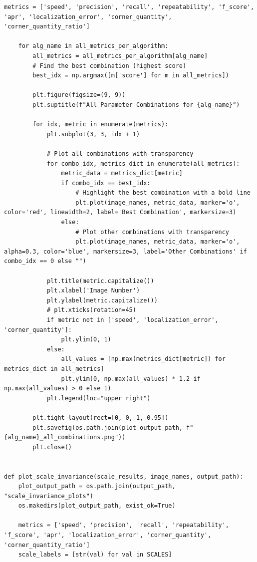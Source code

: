 \documentclass[journal]{IEEEtran}
\begin{document}
\begin{lstlisting}[style=python, caption={Utility Functions for Data Processing}, label={lst:utilities}]
    metrics = ['speed', 'precision', 'recall', 'repeatability', 'f_score', 'apr', 'localization_error', 'corner_quantity', 'corner_quantity_ratio']
    
    for alg_name in all_metrics_per_algorithm:
        all_metrics = all_metrics_per_algorithm[alg_name]
        # Find the best combination (highest score)
        best_idx = np.argmax([m['score'] for m in all_metrics])
        
        plt.figure(figsize=(9, 9))
        plt.suptitle(f"All Parameter Combinations for {alg_name}")
        
        for idx, metric in enumerate(metrics):
            plt.subplot(3, 3, idx + 1)
            
            # Plot all combinations with transparency
            for combo_idx, metrics_dict in enumerate(all_metrics):
                metric_data = metrics_dict[metric]
                if combo_idx == best_idx:
                    # Highlight the best combination with a bold line
                    plt.plot(image_names, metric_data, marker='o', color='red', linewidth=2, label='Best Combination', markersize=3)
                else:
                    # Plot other combinations with transparency
                    plt.plot(image_names, metric_data, marker='o', alpha=0.3, color='blue', markersize=3, label='Other Combinations' if combo_idx == 0 else "")
            
            plt.title(metric.capitalize())
            plt.xlabel('Image Number')
            plt.ylabel(metric.capitalize())
            # plt.xticks(rotation=45)
            if metric not in ['speed', 'localization_error', 'corner_quantity']:
                plt.ylim(0, 1)
            else:
                all_values = [np.max(metrics_dict[metric]) for metrics_dict in all_metrics]
                plt.ylim(0, np.max(all_values) * 1.2 if np.max(all_values) > 0 else 1)
            plt.legend(loc="upper right")
        
        plt.tight_layout(rect=[0, 0, 1, 0.95])
        plt.savefig(os.path.join(plot_output_path, f"{alg_name}_all_combinations.png"))
        plt.close()
        

def plot_scale_invariance(scale_results, image_names, output_path):
    plot_output_path = os.path.join(output_path, "scale_invariance_plots")
    os.makedirs(plot_output_path, exist_ok=True)
    
    metrics = ['speed', 'precision', 'recall', 'repeatability', 'f_score', 'apr', 'localization_error', 'corner_quantity', 'corner_quantity_ratio']
    scale_labels = [str(val) for val in SCALES]
    

\end{lstlisting}
\end{document}
